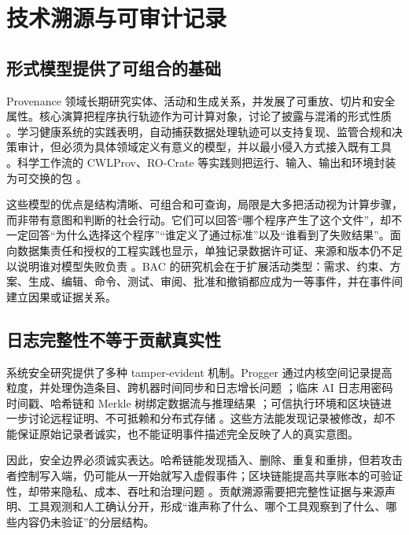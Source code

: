\documentclass[UTF8,a4paper,12pt]{ctexart}
\begin{document}
\section{技术溯源与可审计记录}
\subsection{形式模型提供了可组合的基础}
Provenance 领域长期研究实体、活动和生成关系，并发展了可重放、切片和安全属性。核心演算把程序执行轨迹作为可计算对象，讨论了披露与混淆的形式性质 \cite{acorecalculus2012,acorecalculus2013}。学习健康系统的实践表明，自动捕获数据处理轨迹可以支持复现、监管合规和决策审计，但必须为具体领域定义有意义的模型，并以最小侵入方式接入既有工具 \cite{embeddingdataprovenance2016}。科学工作流的 CWLProv、RO-Crate 等实践则把运行、输入、输出和环境封装为可交换的包 \cite{sharinginteroperableworkflow2019,recordingprovenanceof2024}。

这些模型的优点是结构清晰、可组合和可查询，局限是大多把活动视为计算步骤，而非带有意图和判断的社会行动。它们可以回答“哪个程序产生了这个文件”，却不一定回答“为什么选择这个程序”“谁定义了通过标准”以及“谁看到了失败结果”。面向数据集责任和授权的工程实践也显示，单独记录数据许可证、来源和版本仍不足以说明谁对模型失败负责 \cite{thedataprovenance2023,towardsaccountabilityfor2021}。BAC 的研究机会在于扩展活动类型：需求、约束、方案、生成、编辑、命令、测试、审阅、批准和撤销都应成为一等事件，并在事件间建立因果或证据关系。

\subsection{日志完整性不等于贡献真实性}
系统安全研究提供了多种 tamper-evident 机制。Progger 通过内核空间记录提高粒度，并处理伪造条目、跨机器时间同步和日志增长问题 \cite{proggeranefficient2014}；临床 AI 日志用密码时间戳、哈希链和 Merkle 树绑定数据流与推理结果 \cite{trustbutverify2023}；可信执行环境和区块链进一步讨论远程证明、不可抵赖和分布式存储 \cite{teepatee2024,usingblockchainledgers2025,blockchainbased2024}。这些方法能发现记录被修改，却不能保证原始记录者诚实，也不能证明事件描述完全反映了人的真实意图。

因此，安全边界必须诚实表达。哈希链能发现插入、删除、重复和重排，但若攻击者控制写入端，仍可能从一开始就写入虚假事件；区块链能提高共享账本的可验证性，却带来隐私、成本、吞吐和治理问题 \cite{systematicreviewon2022,thesecurityand2015}。贡献溯源需要把完整性证据与来源声明、工具观测和人工确认分开，形成“谁声称了什么、哪个工具观察到了什么、哪些内容仍未验证”的分层结构。
\end{document}
